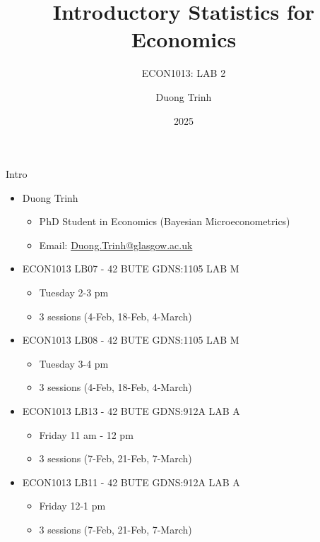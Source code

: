 \documentclass[
  10pt,
  ignorenonframetext,
]{beamer}
\title{Introductory Statistics for Economics}
\subtitle{ECON1013: LAB 2}
\author{Duong Trinh}
\date{2025}
\institute{University of Glasgow}
\providecommand{\tightlist}{%
  \setlength{\itemsep}{0pt}\setlength{\parskip}{0pt}}
\begin{document}
\frame{\titlepage}

\begin{frame}{Intro}
\protect\hypertarget{intro}{}
\begin{itemize}
\tightlist
\item
  Duong Trinh

  \begin{itemize}
  \tightlist
  \item
    PhD Student in Economics (Bayesian Microeconometrics)
  \item
    Email: \underline{Duong.Trinh@glasgow.ac.uk}
  \end{itemize}
\end{itemize}

\vspace{2mm}

\begin{itemize}
\tightlist
\item
  ECON1013 LB07 - 42 BUTE GDNS:1105 LAB M

  \begin{itemize}
  \tightlist
  \item
    Tuesday 2-3 pm
  \item
    3 sessions (4-Feb, 18-Feb, 4-March)
  \end{itemize}
\item
  ECON1013 LB08 - 42 BUTE GDNS:1105 LAB M

  \begin{itemize}
  \tightlist
  \item
    Tuesday 3-4 pm
  \item
    3 sessions (4-Feb, 18-Feb, 4-March)
  \end{itemize}
\item
  ECON1013 LB13 - 42 BUTE GDNS:912A LAB A

  \begin{itemize}
  \tightlist
  \item
    Friday 11 am - 12 pm
  \item
    3 sessions (7-Feb, 21-Feb, 7-March)
  \end{itemize}
\item
  ECON1013 LB11 - 42 BUTE GDNS:912A LAB A

  \begin{itemize}
  \tightlist
  \item
    Friday 12-1 pm
  \item
    3 sessions (7-Feb, 21-Feb, 7-March)
  \end{itemize}
\end{itemize}

\vspace{3mm}
\end{frame}
\end{document}
